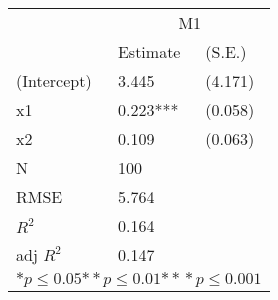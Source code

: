 \begin{tabular}{*{3}{l}}
\hline
                  & \multicolumn{2}{c}{M1}   \tabularnewline
                   &Estimate  &(S.E.)  \tabularnewline
 \hline
 \hline
   (Intercept)     &3.445   &   (4.171) \tabularnewline
   x1              &0.223***   &   (0.058) \tabularnewline
   x2              &0.109   &   (0.063) \tabularnewline
 \hline
 N                 &100       &        \tabularnewline
 RMSE             &5.764         & \tabularnewline
 $R^2$             &0.164         & \tabularnewline
 adj $R^2$         &0.147         & \tabularnewline
 \hline
\hline
 
 \multicolumn{3}{c}{${*  p}\le 0.05$${*\!\!*  p}\le 0.01$${*\!\!*\!\!*  p}\le 0.001$}\tabularnewline
 \end{tabular}